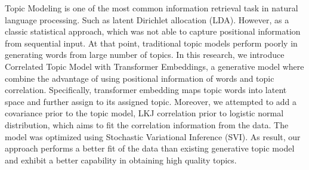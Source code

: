 \documentclass[master,interim,11pt]{iscs-thesis}
\date{\today}
\begin{document}
\begin{eabstract}
Topic Modeling is one of the most common information retrieval task in
natural language processing. Such as latent Dirichlet allocation (LDA).
However, as a classic statistical approach, which was not able to
capture positional information from sequential input. At that point,
traditional topic models perform poorly in generating words from large
number of topics. In this research, we introduce Correlated Topic Model
with Transformer Embeddings, a generative model where combine the
advantage of using positional information of words and topic
correlation. Specifically, transformer embedding maps topic words
into latent space and further assign to its assigned topic. Moreover, we
attempted to add a covariance prior to the topic model, LKJ correlation
prior to logistic normal distribution, which aims to fit the correlation
information from the data. The model was optimized using Stochastic
Variational Inference (SVI). As result, our approach performs a better
fit of the data than existing generative topic model and exhibit a
better capability in obtaining high quality topics.
\end{eabstract}
\maketitle
\end{document}
